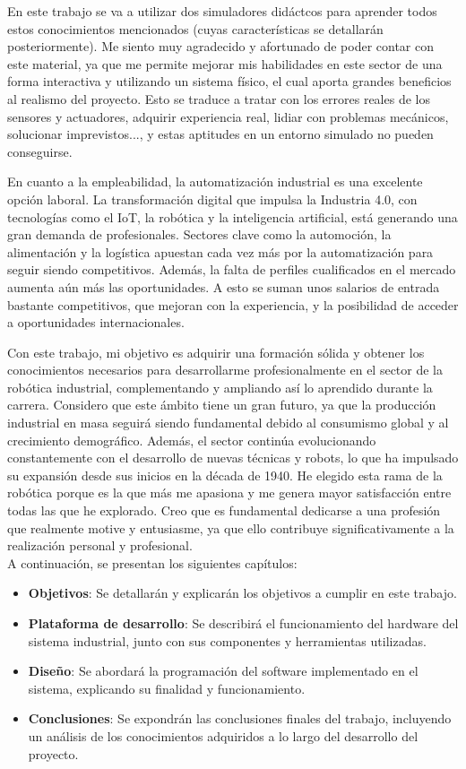 En este trabajo se va a utilizar dos simuladores didáctcos para aprender todos estos conocimientos mencionados (cuyas características se detallarán posteriormente). Me siento muy agradecido y afortunado de poder contar con este material, ya que me permite mejorar mis habilidades en este sector de una forma interactiva y utilizando un sistema físico, el cual aporta grandes beneficios al realismo del proyecto. Esto se traduce a tratar con los errores reales de los sensores y actuadores, adquirir experiencia real, lidiar con problemas mecánicos, solucionar imprevistos..., y estas aptitudes en un entorno simulado no pueden conseguirse. 

En cuanto a la empleabilidad, la automatización industrial es una excelente opción laboral. La transformación digital que impulsa la Industria 4.0, con tecnologías como el IoT, la robótica y la inteligencia artificial, está generando una gran demanda de profesionales. Sectores clave como la automoción, la alimentación y la logística apuestan cada vez más por la automatización para seguir siendo competitivos. Además, la falta de perfiles cualificados en el mercado aumenta aún más las oportunidades. A esto se suman unos salarios de entrada bastante competitivos, que mejoran con la experiencia, y la posibilidad de acceder a oportunidades internacionales.

Con este trabajo, mi objetivo es adquirir una formación sólida y obtener los conocimientos necesarios para desarrollarme profesionalmente en el sector de la robótica industrial, complementando y ampliando así lo aprendido durante la carrera. Considero que este ámbito tiene un gran futuro, ya que la producción industrial en masa seguirá siendo fundamental debido al consumismo global y al crecimiento demográfico. Además, el sector continúa evolucionando constantemente con el desarrollo de nuevas técnicas y robots, lo que ha impulsado su expansión desde sus inicios en la década de 1940. He elegido esta rama de la robótica porque es la que más me apasiona y me genera mayor satisfacción entre todas las que he explorado. Creo que es fundamental dedicarse a una profesión que realmente motive y entusiasme, ya que ello contribuye significativamente a la realización personal y profesional. \\

A continuación, se presentan los siguientes capítulos:

\begin{itemize}
    \item \textbf{Objetivos}: Se detallarán y explicarán los objetivos a cumplir en este trabajo.
    \item \textbf{Plataforma de desarrollo}: Se describirá el funcionamiento del hardware del sistema industrial, junto con sus componentes y herramientas utilizadas.
    \item \textbf{Diseño}: Se abordará la programación del software implementado en el sistema, explicando su finalidad y funcionamiento.
    \item \textbf{Conclusiones}: Se expondrán las conclusiones finales del trabajo, incluyendo un análisis de los conocimientos adquiridos a lo largo del desarrollo del proyecto.
\end{itemize}
